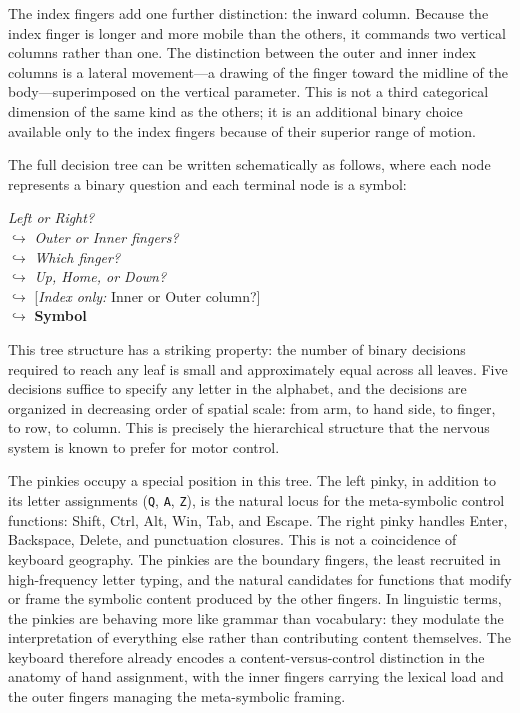 \documentclass[12pt,a4paper]{article}
\theoremstyle{plain}
\theoremstyle{definition}
\theoremstyle{remark}
\begin{document}
The index fingers add one further distinction: the inward column. Because the
index finger is longer and more mobile than the others, it commands two vertical
columns rather than one. The distinction between the outer and inner index
columns is a lateral movement---a drawing of the finger toward the midline of
the body---superimposed on the vertical parameter. This is not a third
categorical dimension of the same kind as the others; it is an additional
binary choice available only to the index fingers because of their superior
range of motion.

The full decision tree can be written schematically as follows, where each
node represents a binary question and each terminal node is a symbol:

\begin{center}
\textit{Left or Right?} \\[4pt]
$\hookrightarrow$ \textit{Outer or Inner fingers?} \\[4pt]
$\hookrightarrow$ \textit{Which finger?} \\[4pt]
$\hookrightarrow$ \textit{Up, Home, or Down?} \\[4pt]
$\hookrightarrow$ [\textit{Index only:} Inner or Outer column?] \\[4pt]
$\hookrightarrow$ \textbf{Symbol}
\end{center}

This tree structure has a striking property: the number of binary decisions
required to reach any leaf is small and approximately equal across all leaves.
Five decisions suffice to specify any letter in the alphabet, and the decisions
are organized in decreasing order of spatial scale: from arm, to hand side,
to finger, to row, to column. This is precisely the hierarchical structure that
the nervous system is known to prefer for motor control.

The pinkies occupy a special position in this tree. The left pinky, in addition
to its letter assignments (\texttt{Q}, \texttt{A}, \texttt{Z}), is the natural
locus for the meta-symbolic control functions: Shift, Ctrl, Alt, Win, Tab,
and Escape. The right pinky handles Enter, Backspace, Delete, and punctuation
closures. This is not a coincidence of keyboard geography. The pinkies are the
boundary fingers, the least recruited in high-frequency letter typing, and the
natural candidates for functions that modify or frame the symbolic content
produced by the other fingers. In linguistic terms, the pinkies are behaving
more like grammar than vocabulary: they modulate the interpretation of
everything else rather than contributing content themselves. The keyboard
therefore already encodes a content-versus-control distinction in the anatomy
of hand assignment, with the inner fingers carrying the lexical load and the
outer fingers managing the meta-symbolic framing.
\end{document}
